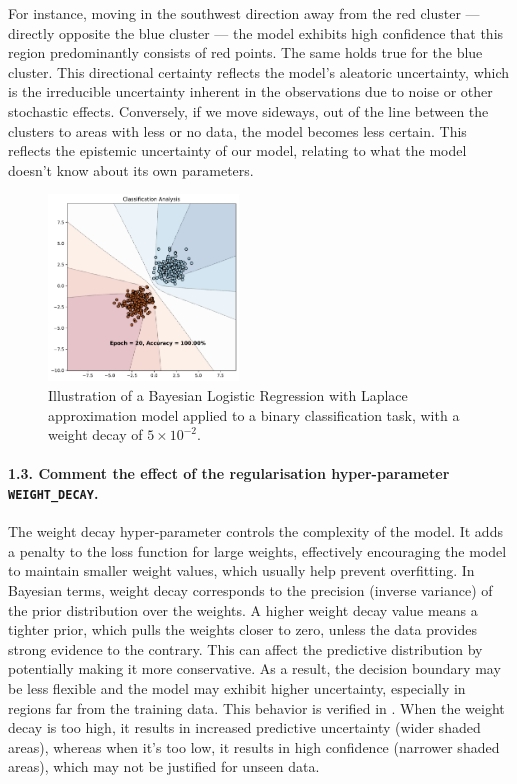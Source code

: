 For instance, moving in the southwest direction away from the red cluster — directly opposite the blue cluster — the model exhibits high confidence that this region predominantly consists of red points. The same holds true for the blue cluster. This directional certainty reflects the model's aleatoric uncertainty, which is the irreducible uncertainty inherent in the observations due to noise or other stochastic effects. Conversely, if we move sideways, out of the line between the clusters to areas with less or no data, the model becomes less certain. This reflects the epistemic uncertainty of our model, relating to what the model doesn't know about its own parameters.

\begin{figure}[H]
    \centering
    \includegraphics[width=0.45\textwidth]{laplace_approx.pdf}
    \caption{Illustration of a Bayesian Logistic Regression with Laplace approximation model applied to a binary classification task, with a weight decay of $5 \times 10^{-2}$.}
    \label{fig:laplace_approx}
\end{figure}


\paragraph{1.3. Comment the effect of the regularisation hyper-parameter \texttt{WEIGHT\_DECAY}.}

The weight decay hyper-parameter controls the complexity of the model. It adds a penalty to the loss function for large weights, effectively encouraging the model to maintain smaller weight values, which usually help prevent overfitting. In Bayesian terms, weight decay corresponds to the precision (inverse variance) of the prior distribution over the weights. A higher weight decay value means a tighter prior, which pulls the weights closer to zero, unless the data provides strong evidence to the contrary. This can affect the predictive distribution by potentially making it more conservative. As a result, the decision boundary may be less flexible and the model may exhibit higher uncertainty, especially in regions far from the training data. This behavior is verified in . When the weight decay is too high, it results in increased predictive uncertainty (wider shaded areas), whereas when it's too low, it results in high confidence (narrower shaded areas), which may not be justified for unseen data.

